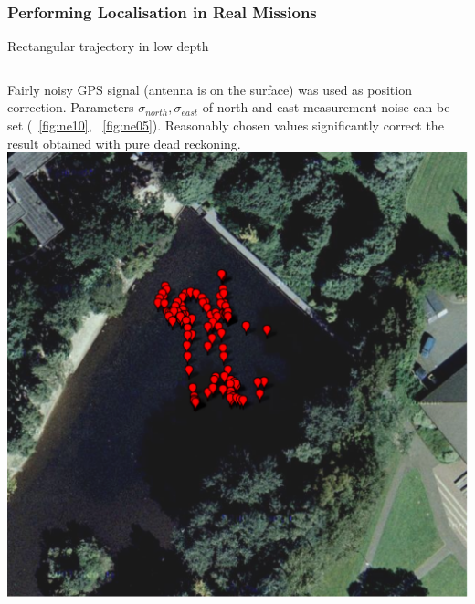 \begin{frame}\frametitle{Performing Localisation in Real Missions}
\begin{block}{Rectangular trajectory in low depth}
\begin{columns}
Fairly noisy GPS signal (antenna is on the surface) was used as position correction. Parameters $\sigma_{north},\sigma_{east}$ of north and east measurement noise can be set (~\ref{fig:ne10}, ~\ref{fig:ne05}). Reasonably chosen values significantly correct the result obtained with pure dead reckoning. %
\centering
\includegraphics[width=0.95\linewidth]{fig/square-trajectory.pdf}
\end{columns}
\end{block}
\vspace{-10pt}
\centering 
\begin{figure}%

\end{figure}
\end{frame}
